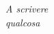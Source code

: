\cleardoublepage
\thispagestyle{empty}
\begin{flushright}
    \itshape A scrivere\\
    qualcosa
\end{flushright}

